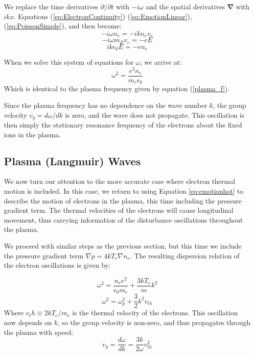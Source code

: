 \documentclass[twocolumn]{article}
\begin{document}
We replace the time derivatives $\partial/\partial t$ with $-i\omega$ and the spatial derivatives $\mathbf{\nabla}$ with $ikx$.
Equations (\ref{eq:ElectronContinuity}) (\ref{eq:EmotionLinear}), (\ref{eq:PoissonSimple}), and  then become:
\begin{equation*}
	-i\omega n_e = -ikn_ev_e
\end{equation*}
\begin{equation*}
	-i\omega m_E v_e= -eE
\end{equation*}
\begin{equation*}
	ik\epsilon_0E = -en_e
\end{equation*}

When we solve this system of equations for $\omega$, we arrive at:
\begin{equation}
	\omega^2 = \frac{e^2 n_e}{m_e\epsilon_0}
\end{equation}
Which is identical to the plasma frequency given by equation (\ref{plasma_f}).

Since the plasma frequency has no dependence on the wave number $k$, the group velocity $v_g = d\omega/dk$ is zero, and the wave does not propagate.
This oscillation is then simply the stationary resonance frequency of the electrons about the fixed ions in the plasma.
\subsection*{Plasma (Langmuir) Waves}
	We now turn our attention to the more accurate case where electron thermal motion is included.
	In this case, we return to using Equation \ref{eq:emotionhot} to describe the motion of electrons in the plasma, this time including the pressure gradient term.
	The thermal velocities of the electrons will cause longitudinal movement, thus carrying information of the disturbance oscillations throughout the plasma.
	
	We proceed with similar steps as the previous section, but this time we include the pressure gradient term $\nabla p = 4kT_e\nabla n_e$.
	The resulting dispersion relation of the electron oscillations is given by:
	
	\begin{equation*}
		\omega^2 = \frac{n_e e^2}{\epsilon_0 m_e} + \frac{3kT_e}{m}k^2
	\end{equation*}
	\begin{equation}
		\omega^2 = \omega^2_p + \frac{3}{2}k^2 v_{th}
	\end{equation}
	Where $v_th \equiv 2kT_e/m_e$ is the thermal velocity of the electrons.
	This oscillation now depends on $k$, so the group velocity is non-zero, and thus propagates through the plasma with speed:
	\begin{equation}
		v_g = \frac{d\omega}{dk} = \frac{3k}{2\omega}v^2_{th}
	\end{equation}
	
\end{document}
